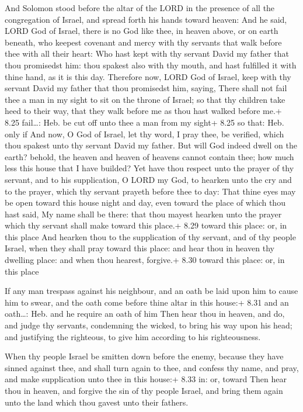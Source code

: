  And Solomon stood before the altar of the LORD in the
presence of all the congregation of Israel, and spread forth his hands
toward heaven:  And he said, LORD God of Israel, there is
no God like thee, in heaven above, or on earth beneath, who keepest
covenant and mercy with thy servants that walk before thee with all
their heart:  Who hast kept with thy servant David my
father that thou promisedst him: thou spakest also with thy mouth, and
hast fulfilled it with thine hand, as it is this day. 
Therefore now, LORD God of Israel, keep with thy servant David my father
that thou promisedst him, saying, There shall not fail thee a man in my
sight to sit on the throne of Israel; so that thy children take heed to
their way, that they walk before me as thou hast walked before me.+ 8.25
fail\ldots: Heb. be cut off unto thee a man from my sight+ 8.25 so that:
Heb. only if  And now, O God of Israel, let thy word, I
pray thee, be verified, which thou spakest unto thy servant David my
father.  But will God indeed dwell on the earth? behold,
the heaven and heaven of heavens cannot contain thee; how much less this
house that I have builded?  Yet have thou respect unto the
prayer of thy servant, and to his supplication, O LORD my God, to
hearken unto the cry and to the prayer, which thy servant prayeth before
thee to day:  That thine eyes may be open toward this house
night and day, even toward the place of which thou hast said, My name
shall be there: that thou mayest hearken unto the prayer which thy
servant shall make toward this place.+ 8.29 toward this place: or, in
this place  And hearken thou to the supplication of thy
servant, and of thy people Israel, when they shall pray toward this
place: and hear thou in heaven thy dwelling place: and when thou
hearest, forgive.+ 8.30 toward this place: or, in this place

 If any man trespass against his neighbour, and an oath
be laid upon him to cause him to swear, and the oath come before thine
altar in this house:+ 8.31 and an oath\ldots: Heb. and he require an
oath of him  Then hear thou in heaven, and do, and judge
thy servants, condemning the wicked, to bring his way upon his head; and
justifying the righteous, to give him according to his righteousness.

 When thy people Israel be smitten down before the enemy,
because they have sinned against thee, and shall turn again to thee, and
confess thy name, and pray, and make supplication unto thee in this
house:+ 8.33 in: or, toward  Then hear thou in heaven, and
forgive the sin of thy people Israel, and bring them again unto the land
which thou gavest unto their fathers.

